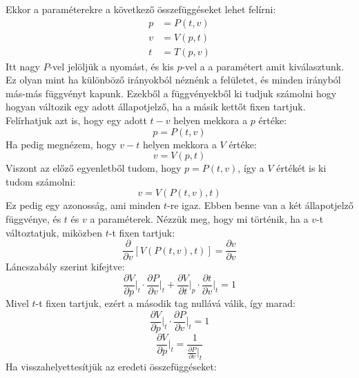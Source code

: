 \documentclass[a4paper,12pt]{article}
\begin{document}
Ekkor a paraméterekre a következő összefüggéseket lehet felírni:
\begin{equation}
    \begin{aligned}
        p &= P(t, v) \\
        v &= V(p, t) \\
        t &= T(p, v)
    \end{aligned}
\end{equation}
Itt nagy $P$-vel jelöljük a nyomást, és kis $p$-vel a a paramétert amit kiválasztunk. Ez olyan mint ha különböző irányokból néznénk a felületet, és minden irányból más-más függvényt kapunk. Ezekből a függvényekből ki tudjuk számolni hogy hogyan változik egy adott állapotjelző, ha a másik kettőt fixen tartjuk.
Felírhatjuk azt is, hogy egy adott $t-v$ helyen mekkora a $p$ értéke:
\begin{equation}
    p = P(t, v)
\end{equation}
Ha pedig megnézem, hogy $v-t$ helyen mekkora a $V$ értéke:
\begin{equation}
    v = V(p, t)
\end{equation}
Viszont az előző egyenletből tudom, hogy $p = P(t, v)$, így a $V$ értékét is ki tudom számolni:
\begin{equation}
    v = V(P(t, v), t)
\end{equation}
Ez pedig egy azonosság, ami minden $t$-re igaz. Ebben benne van a két állapotjelző függvénye, és $t$ és $v$ a paraméterek. Nézzük meg, hogy mi történik, ha a $v$-t változtatjuk, miközben $t$-t fixen tartjuk:
\begin{equation}
    \frac{\partial}{\partial v} \left[V(P(t, v), t)\right] = \frac{\partial v}{\partial v}
\end{equation}
Láncszabály szerint kifejtve:
\begin{equation}
    \frac{\partial V}{\partial p}\bigg|_{t} \cdot \frac{\partial P}{\partial v}\bigg|_{t} + \frac{\partial V}{\partial t}\bigg|_{p} \cdot \frac{\partial t}{\partial v}\bigg|_{t} = 1
\end{equation}
Mivel $t$-t fixen tartjuk, ezért a második tag nullává válik, így marad:
\begin{equation}
    \frac{\partial V}{\partial p}\bigg|_{t} \cdot \frac{\partial P}{\partial v}\bigg|_{t} = 1
\end{equation}
\begin{equation}
    \frac{\partial V}{\partial p}\bigg|_{t} = \frac{1}{\frac{\partial P}{\partial v}\big|_{t}}
\end{equation}
Ha visszahelyettesítjük az eredeti összefüggéseket:
\end{document}
